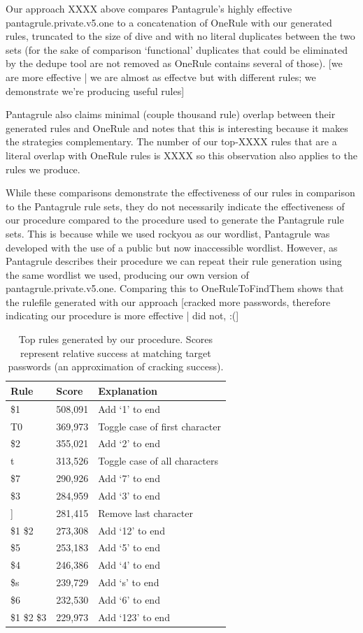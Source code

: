 \documentclass[letterpaper,twocolumn,10pt]{article}
\begin{document}
Our approach XXXX above compares Pantagrule's highly effective pantagrule.private.v5.one
to a concatenation of OneRule with our generated rules, truncated to the size of dive
and with no literal duplicates between the two sets (for the sake of comparison `functional'
duplicates that could be eliminated by the dedupe tool are not removed as OneRule contains
several of those).  [we are more effective | we are almost as effectve but with different rules;
we demonstrate we're producing useful rules]

Pantagrule also claims minimal (couple thousand rule) overlap between their generated rules and OneRule
and notes that this is interesting because it makes the strategies complementary. The number of our top-XXXX rules
that are a literal overlap with OneRule rules is XXXX so this observation also applies to the rules we produce.

While these comparisons demonstrate the effectiveness of our rules in comparison to the Pantagrule
rule sets, they do not necessarily indicate the effectiveness of our procedure compared to
the procedure used to generate the Pantagrule rule sets. This is because while we used rockyou as
our wordlist, Pantagrule was developed with the use of a public but now inaccessible wordlist.
However, as Pantagrule describes their procedure we can repeat their rule generation using
the same wordlist we used, producing our own version of pantagrule.private.v5.one. Comparing
this to OneRuleToFindThem shows that the rulefile generated with our approach [cracked more passwords,
therefore indicating our procedure is more effective | did not, :(]

\begin{table}
\centering
\begin{tabular}{|l|l|l|}
\hline
Rule & Score & Explanation \\
\hline
\$1 & 508,091 & Add `1' to end \\
T0 & 369,973 & Toggle case of first character \\
\$2 & 355,021 & Add `2' to end \\
t & 313,526 & Toggle case of all characters \\
\$7 & 290,926 & Add `7' to end \\
\$3 & 284,959 & Add `3' to end \\
] & 281,415 & Remove last character \\
\$1 \$2 & 273,308 & Add `12' to end \\
\$5 & 253,183 & Add `5' to end \\
\$4 & 246,386 & Add `4' to end \\
\$s & 239,729 & Add `s' to end \\
\$6 & 232,530 & Add `6' to end \\
\$1 \$2 \$3 & 229,973 & Add `123' to end \\
\hline
\end{tabular}
\caption{Top rules generated by our procedure. Scores represent relative
success at matching target passwords (an approximation of cracking success).}
\label{tab:top_rules}
\end{table}
\end{document}
